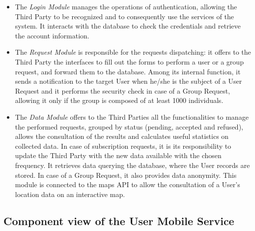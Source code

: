 \begin{itemize}
\item  The \emph{Login Module} manages the operations of authentication, allowing the Third Party to be recognized and to consequently use the services of the system. It interacts with the database to check the credentials and retrieve the account information.

\item The \emph{Request Module} is responsible for the requests dispatching: it offers to the Third Party the interfaces to fill out the forms to perform a user or a group request, and forward them to the database. Among its internal function, it sends a notification to the target User when he/she is the subject of a User Request and it performs the security check in case of  a Group Request, allowing it only if the group is composed of at least 1000 individuals.
    
\item The \emph{Data Module} offers to the Third Parties all the functionalities to manage the performed requests, grouped by status (pending, accepted and refused), allows the consultation of the results and calculates useful statistics on collected data. In case of subscription requests, it is its responsibility to update the Third Party with the new data available with the chosen frequency.
It retrieves data querying the database, where the User records are stored. In case of a Group Request, it also provides data anonymity.
This module is connected to the maps API to allow the consultation of a User's location data on an interactive map.
    
\end{itemize} 
   
\subsection{Component view of the User Mobile Service}

